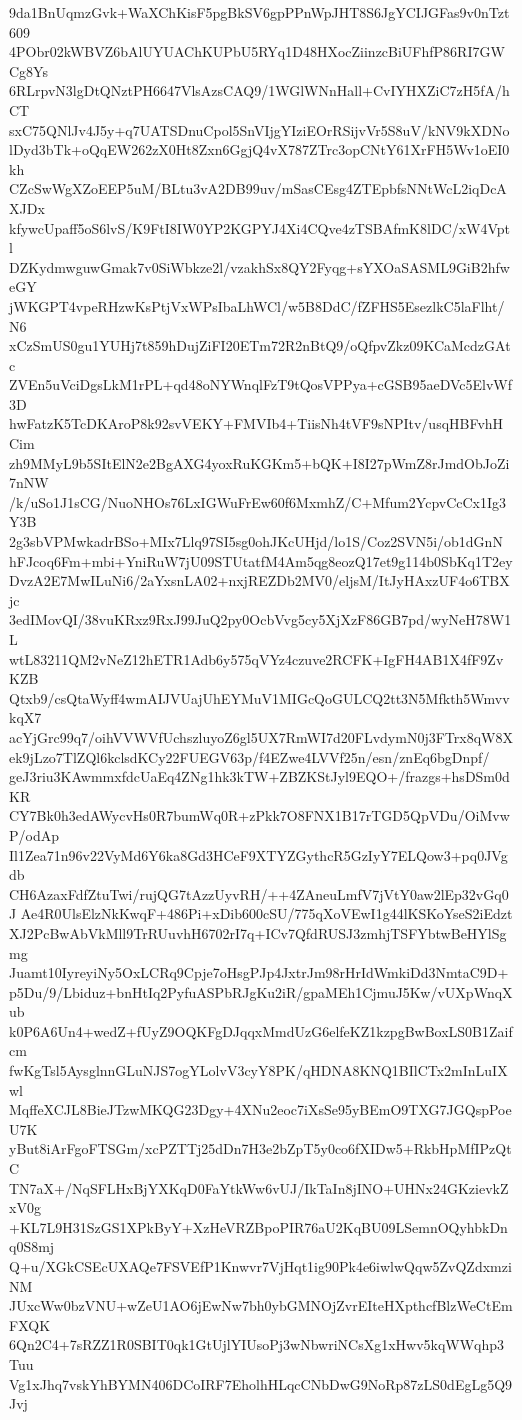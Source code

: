 9da1BnUqmzGvk+WaXChKisF5pgBkSV6gpPPnWpJHT8S6JgYCIJGFas9v0nTzt609
4PObr02kWBVZ6bAlUYUAChKUPbU5RYq1D48HXocZiinzcBiUFhfP86RI7GWCg8Ys
6RLrpvN3lgDtQNztPH6647VlsAzsCAQ9/1WGlWNnHall+CvIYHXZiC7zH5fA/hCT
sxC75QNlJv4J5y+q7UATSDnuCpol5SnVIjgYIziEOrRSijvVr5S8uV/kNV9kXDNo
lDyd3bTk+oQqEW262zX0Ht8Zxn6GgjQ4vX787ZTrc3opCNtY61XrFH5Wv1oEI0kh
CZcSwWgXZoEEP5uM/BLtu3vA2DB99uv/mSasCEsg4ZTEpbfsNNtWcL2iqDcAXJDx
kfywcUpaff5oS6lvS/K9FtI8IW0YP2KGPYJ4Xi4CQve4zTSBAfmK8lDC/xW4Vptl
DZKydmwguwGmak7v0SiWbkze2l/vzakhSx8QY2Fyqg+sYXOaSASML9GiB2hfweGY
jWKGPT4vpeRHzwKsPtjVxWPsIbaLhWCl/w5B8DdC/fZFHS5EsezlkC5laFlht/N6
xCzSmUS0gu1YUHj7t859hDujZiFI20ETm72R2nBtQ9/oQfpvZkz09KCaMcdzGAtc
ZVEn5uVciDgsLkM1rPL+qd48oNYWnqlFzT9tQosVPPya+cGSB95aeDVc5ElvWf3D
hwFatzK5TcDKAroP8k92svVEKY+FMVIb4+TiisNh4tVF9sNPItv/usqHBFvhHCim
zh9MMyL9b5SItElN2e2BgAXG4yoxRuKGKm5+bQK+I8I27pWmZ8rJmdObJoZi7nNW
/k/uSo1J1sCG/NuoNHOs76LxIGWuFrEw60f6MxmhZ/C+Mfum2YcpvCcCx1Ig3Y3B
2g3sbVPMwkadrBSo+MIx7Llq97SI5sg0ohJKcUHjd/lo1S/Coz2SVN5i/ob1dGnN
hFJcoq6Fm+mbi+YniRuW7jU09STUtatfM4Am5qg8eozQ17et9g114b0SbKq1T2ey
DvzA2E7MwILuNi6/2aYxsnLA02+nxjREZDb2MV0/eljsM/ItJyHAxzUF4o6TBXjc
3edIMovQI/38vuKRxz9RxJ99JuQ2py0OcbVvg5cy5XjXzF86GB7pd/wyNeH78W1L
wtL83211QM2vNeZ12hETR1Adb6y575qVYz4czuve2RCFK+IgFH4AB1X4fF9ZvKZB
Qtxb9/csQtaWyff4wmAIJVUajUhEYMuV1MIGcQoGULCQ2tt3N5Mfkth5WmvvkqX7
acYjGrc99q7/oihVVWVfUchszluyoZ6gl5UX7RmWI7d20FLvdymN0j3FTrx8qW8X
ek9jLzo7TlZQl6kclsdKCy22FUEGV63p/f4EZwe4LVVf25n/esn/znEq6bgDnpf/
geJ3riu3KAwmmxfdcUaEq4ZNg1hk3kTW+ZBZKStJyl9EQO+/frazgs+hsDSm0dKR
CY7Bk0h3edAWycvHs0R7bumWq0R+zPkk7O8FNX1B17rTGD5QpVDu/OiMvwP/odAp
Il1Zea71n96v22VyMd6Y6ka8Gd3HCeF9XTYZGythcR5GzIyY7ELQow3+pq0JVgdb
CH6AzaxFdfZtuTwi/rujQG7tAzzUyvRH/++4ZAneuLmfV7jVtY0aw2lEp32vGq0J
Ae4R0UlsElzNkKwqF+486Pi+xDib600cSU/775qXoVEwI1g44lKSKoYseS2iEdzt
XJ2PcBwAbVkMll9TrRUuvhH6702rI7q+ICv7QfdRUSJ3zmhjTSFYbtwBeHYlSgmg
Juamt10IyreyiNy5OxLCRq9Cpje7oHsgPJp4JxtrJm98rHrIdWmkiDd3NmtaC9D+
p5Du/9/Lbiduz+bnHtIq2PyfuASPbRJgKu2iR/gpaMEh1CjmuJ5Kw/vUXpWnqXub
k0P6A6Un4+wedZ+fUyZ9OQKFgDJqqxMmdUzG6elfeKZ1kzpgBwBoxLS0B1Zaifcm
fwKgTsl5AysglnnGLuNJS7ogYLolvV3cyY8PK/qHDNA8KNQ1BIlCTx2mInLuIXwl
MqffeXCJL8BieJTzwMKQG23Dgy+4XNu2eoc7iXsSe95yBEmO9TXG7JGQspPoeU7K
yBut8iArFgoFTSGm/xcPZTTj25dDn7H3e2bZpT5y0co6fXIDw5+RkbHpMfIPzQtC
TN7aX+/NqSFLHxBjYXKqD0FaYtkWw6vUJ/IkTaIn8jINO+UHNx24GKzievkZxV0g
+KL7L9H31SzGS1XPkByY+XzHeVRZBpoPIR76aU2KqBU09LSemnOQyhbkDnq0S8mj
Q+u/XGkCSEcUXAQe7FSVEfP1Knwvr7VjHqt1ig90Pk4e6iwlwQqw5ZvQZdxmziNM
JUxcWw0bzVNU+wZeU1AO6jEwNw7bh0ybGMNOjZvrEIteHXpthcfBlzWeCtEmFXQK
6Qn2C4+7sRZZ1R0SBIT0qk1GtUjlYIUsoPj3wNbwriNCsXg1xHwv5kqWWqhp3Tuu
Vg1xJhq7vskYhBYMN406DCoIRF7EholhHLqcCNbDwG9NoRp87zLS0dEgLg5Q9Jvj
